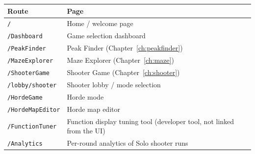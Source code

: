 \documentclass[11pt,a4paper]{report}
\newcommand{\route}[1]{\texttt{#1}}          %
\begin{document}
\begin{center}
\begin{tabularx}{\textwidth}{l X}
  \toprule
  \textbf{Route} & \textbf{Page} \\
  \midrule
  \route{/}                & Home / welcome page \\
  \route{/Dashboard}       & Game selection dashboard \\
  \route{/PeakFinder}      & Peak Finder (Chapter~\ref{ch:peakfinder}) \\
  \route{/MazeExplorer}    & Maze Explorer (Chapter~\ref{ch:maze}) \\
  \route{/ShooterGame}     & Shooter Game (Chapter~\ref{ch:shooter}) \\
  \route{/lobby/shooter}   & Shooter lobby / mode selection \\
  \route{/HordeGame}       & Horde mode \\
  \route{/HordeMapEditor}  & Horde map editor \\
  \route{/FunctionTuner}   & Function display tuning tool (developer tool,
                             not linked from the UI) \\
  \route{/Analytics}       & Per-round analytics of Solo shooter runs \\
  \bottomrule
\end{tabularx}
\end{center}
\end{document}
